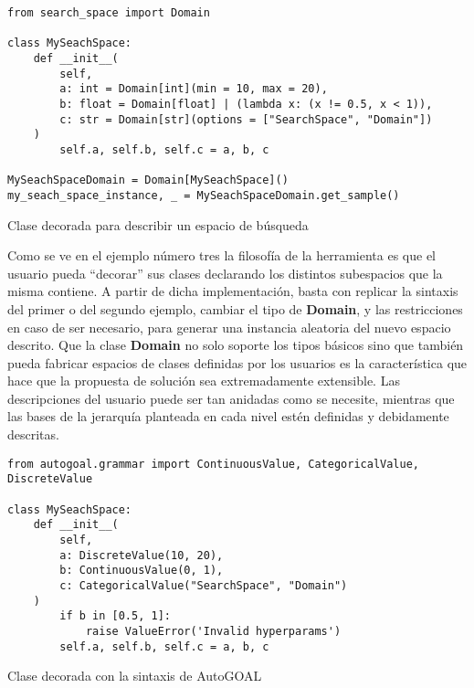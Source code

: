 \begin{listing}[!ht]
    \begin{verbatim}
from search_space import Domain

class MySeachSpace:
    def __init__(
        self, 
        a: int = Domain[int](min = 10, max = 20),
        b: float = Domain[float] | (lambda x: (x != 0.5, x < 1)),
        c: str = Domain[str](options = ["SearchSpace", "Domain"])
    )
        self.a, self.b, self.c = a, b, c

MySeachSpaceDomain = Domain[MySeachSpace]()
my_seach_space_instance, _ = MySeachSpaceDomain.get_sample()
    \end{verbatim}
    \caption{Clase decorada para describir un espacio de búsqueda}
    \label{ex:class}
\end{listing}





Como se ve en el ejemplo número tres la filosofía de la herramienta es que el usuario pueda “decorar” sus
clases declarando los distintos subespacios que la misma contiene. A partir de dicha implementación, basta
con replicar la sintaxis del primer o del segundo ejemplo, cambiar el tipo de {\bf Domain}, y las restricciones
en caso de ser necesario, para generar una instancia aleatoria del nuevo espacio descrito. Que la clase
    {\bf Domain} no solo soporte los tipos básicos sino que también pueda fabricar espacios de clases definidas por
los usuarios es la característica que hace que la propuesta de solución sea extremadamente extensible. Las
descripciones del usuario puede ser tan anidadas como se necesite, mientras que las bases de la jerarquía
planteada en cada nivel estén definidas y debidamente descritas.



\begin{listing}[!ht]
    \begin{verbatim}
from autogoal.grammar import ContinuousValue, CategoricalValue, DiscreteValue

class MySeachSpace:
    def __init__(
        self, 
        a: DiscreteValue(10, 20),
        b: ContinuousValue(0, 1),
        c: CategoricalValue("SearchSpace", "Domain")
    )
        if b in [0.5, 1]:
            raise ValueError('Invalid hyperparams')
        self.a, self.b, self.c = a, b, c
    \end{verbatim}
    \caption{Clase decorada con la sintaxis de AutoGOAL}
    \label{ex:autogoal}
\end{listing}


